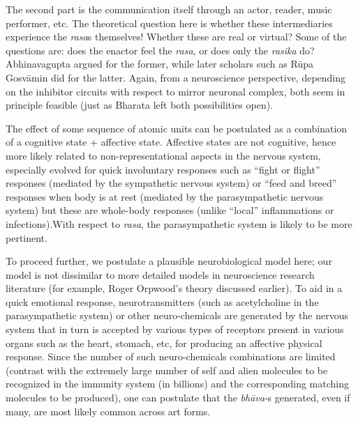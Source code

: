 The second part is the communication itself through an actor, reader, music performer, etc. The theoretical question here is whether these intermediaries experience the \textsl{rasa}s themselves! Whether these are real or virtual? Some of the questions are: does the enactor feel the \textsl{rasa}, or does only the \textsl{rasika} do? Abhinavagupta argued for the former, while later scholars such as Rūpa Gosvāmin did for the latter. Again, from a neuroscience perspective, depending on the inhibitor circuits with respect to mirror neuronal complex, both seem in principle feasible (just as Bharata left both possibilities open).

The effect of some sequence of atomic units can be postulated as a combination of a cognitive state + affective state. Affective states are not cognitive, hence more likely related to non-representational aspects in the nervous system, especially evolved for quick involuntary responses such as “fight or flight” responses (mediated by the sympathetic nervous system) or “feed and breed” responses when body is at rest (mediated by the parasympathetic nervous system) but these are whole-body responses (unlike “local” inflammations or infections).\break With respect to \textsl{rasa}, the parasympathetic system is likely to be more pertinent. 

To proceed further, we postulate a plausible neurobiological model here; our model is not dissimilar to more detailed models in neuroscience research literature (for example, Roger Orpwood’s theory discussed earlier). To aid in a quick emotional response, neurotransmitters (such as acetylcholine in the parasympathetic system) or other neuro-chemicals are generated by the nervous system that in turn is accepted by various types of receptors present in various organs such as the heart, stomach, etc, for producing an affective physical response. Since the number of such neuro-chemicals combinations are limited (contrast with the extremely large number of self and alien molecules to be recognized in the immunity system (in billions) and the corresponding matching molecules to be produced), one can postulate that the \textsl{bhāva}-s generated, even if many, are most likely common across art forms. 

